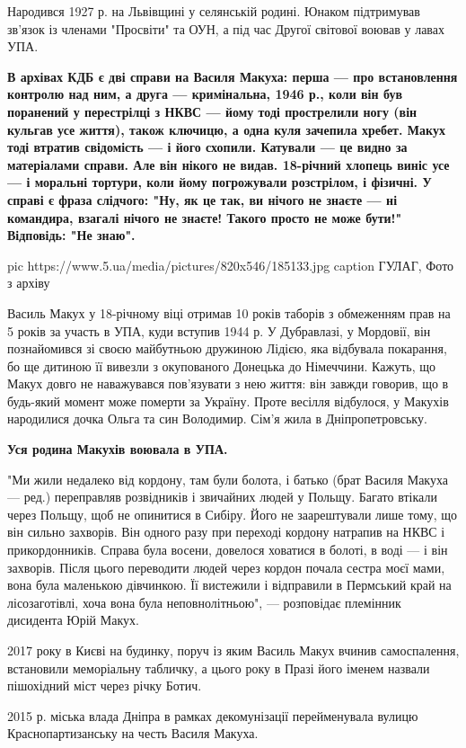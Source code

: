 Народився 1927 р. на Львівщині у селянській родині. Юнаком підтримував
зв'язок із членами "Просвіти" та ОУН, а під час Другої світової воював у
лавах УПА.

{\bfseries
В архівах КДБ є дві справи на Василя Макуха: перша --- про встановлення
контролю над ним, а друга --- кримінальна, 1946 р., коли він був поранений
у перестрілці з НКВС --- йому тоді прострелили ногу (він кульгав усе
життя), також ключицю, а одна куля зачепила хребет. Макух тоді втратив
свідомість --- і його схопили. Катували --- це видно за матеріалами справи.
Але він нікого не видав. 18-річний хлопець виніс усе --- і моральні
тортури, коли йому погрожували розстрілом, і фізичні. У справі є фраза
слідчого: "Ну, як це так, ви нічого не знаєте --- ні командира, взагалі
нічого не знаєте! Такого просто не може бути!" Відповідь: "Не знаю".
}

\ifcmt
pic https://www.5.ua/media/pictures/820x546/185133.jpg
caption ГУЛАГ, Фото з архіву
\fi

Василь Макух у 18-річному віці отримав 10 років таборів з обмеженням прав
на 5 років за участь в УПА, куди вступив 1944 р. У Дубравлазі, у Мордовії,
він познайомився зі своєю майбутньою дружиною Лідією, яка відбувала
покарання, бо ще дитиною її вивезли з окупованого Донецька до Німеччини.
Кажуть, що Макух довго не наважувався пов'язувати з нею життя: він завжди
говорив, що в будь-який момент може померти за Україну. Проте весілля
відбулося, у Макухів народилися дочка Ольга та син Володимир. Сім'я жила в
Дніпропетровську.

\textbf{Уся родина Макухів воювала в УПА.}

"Ми жили недалеко від кордону, там були болота, і батько (брат Василя
Макуха --- ред.) переправляв розвідників і звичайних людей у Польщу. Багато
втікали через Польщу, щоб не опинитися в Сибіру. Його не заарештували лише
тому, що він сильно захворів. Він одного разу при переході кордону
натрапив на НКВС і прикордонників. Справа була восени, довелося ховатися в
болоті, в воді --- і він захворів. Після цього переводити людей через кордон
почала сестра моєї мами, вона була маленькою дівчинкою. Її вистежили і
відправили в Пермський край на лісозаготівлі, хоча вона була
неповнолітньою", --- розповідає племінник дисидента Юрій Макух.

2017 року в Києві на будинку, поруч із яким Василь Макух вчинив
самоспалення, встановили меморіальну табличку, а цього року в Празі його
іменем назвали пішохідний міст через річку Ботич.

2015 р. міська влада Дніпра в рамках декомунізації перейменувала вулицю
Краснопартизанську на честь Василя Макуха.

